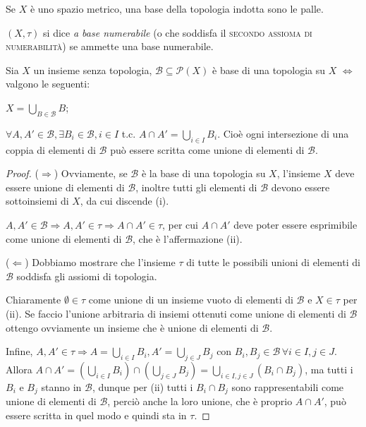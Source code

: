 \documentclass{article}
\begin{document}
\begin{ex}
	Se $X$ è uno spazio metrico, una base della topologia indotta sono le palle.
\end{ex}

\begin{defn} \label{N2}
	$(X, \tau)$ si dice \textit{a base numerabile} (o che soddisfa il
	\textsc{secondo assioma di numerabilità}) se ammette una base numerabile.
\end{defn}

\begin{prop} \label{prop:base}
	Sia $X$ un insieme senza topologia, $\mathcal{B} \subseteq \mathcal{P}(X)$ è
	base di una topologia su $X$ $\Leftrightarrow$ valgono le seguenti:
	\begin{nlist}
		\item \label{i_prop} $\displaystyle X=\bigcup_{B \in \mathcal{B}} B$;
		\item $\forall A, A' \in \mathcal{B}, \exists B_i \in \mathcal{B}, i \in
		I$ t.c. $A \cap A'= \bigcup_{i \in I} B_i$. Cio\`e ogni intersezione di
		una coppia di elementi di $\mathcal{B}$ pu\`o essere scritta come unione
		di elementi di $\mathcal{B}$.
	\end{nlist}
\end{prop}

\begin{proof} \label{prop:preb}
    ($\Rightarrow$) Ovviamente, se $\mathcal{B}$ è la base di una topologia su
    $X$, l'insieme $X$ deve essere unione di elementi di $\mathcal{B}$, inoltre
    tutti gli elementi di $\mathcal{B}$ devono essere sottoinsiemi di $X$, da
    cui discende (i).

	$A, A' \in \mathcal{B} \Rightarrow A, A' \in \tau \Rightarrow A \cap A' \in
	\tau$, per cui $A \cap A'$ deve poter essere esprimibile come unione di
	elementi di $\mathcal{B}$, che è l'affermazione (ii).

	($\Leftarrow$) Dobbiamo mostrare che l'insieme $\tau$ di tutte le possibili
	unioni di elementi di $\mathcal{B}$ soddisfa gli assiomi di topologia.

	Chiaramente $\emptyset \in \tau$ come unione di un insieme vuoto di elementi
	di $\mathcal{B}$ e $X \in \tau$ per (ii).  Se faccio l'unione arbitraria di
	insiemi ottenuti come unione di elementi di $\mathcal{B}$ ottengo ovviamente
	un insieme che è unione di elementi di $\mathcal{B}$.

	Infine, $\displaystyle A, A' \in \tau \Rightarrow A=\bigcup_{i \in I} B_i,
	A'=\bigcup_{j \in J} B_j$ con $B_i, B_j \in \mathcal{B} \, \forall i \in I,
	j \in J$. Allora $\displaystyle A \cap A'= \left(\bigcup_{i \in I} B_i
	\right) \cap \left(\bigcup_{j \in J} B_j \right)=\bigcup_{i \in I, j \in J}
	(B_i \cap B_j)$, ma tutti i $B_i$ e $B_j$ stanno in $\mathcal{B}$, dunque
	per (ii) tutti i $B_i \cap B_j$ sono rappresentabili come unione di elementi
	di $\mathcal{B}$, perciò anche la loro unione, che è proprio $A \cap A'$,
	può essere scritta in quel modo e quindi sta in $\tau$.
\end{proof}
\end{document}
